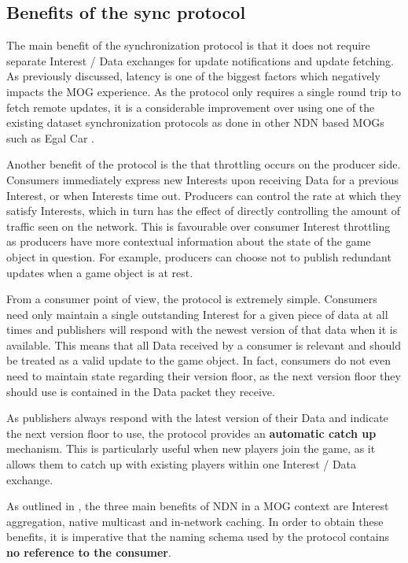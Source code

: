 \subsection{Benefits of the sync protocol}
The main benefit of the synchronization protocol is that it does not require separate Interest / Data exchanges for update notifications and update fetching. As previously discussed, latency is one of the biggest factors which negatively impacts the MOG experience. As the protocol only requires a single round trip to fetch remote updates, it is a considerable improvement over using one of the existing dataset synchronization protocols as done in other NDN based MOGs such as Egal Car \cite{egal-car}.

Another benefit of the protocol is the that throttling occurs on the producer side. Consumers immediately express new Interests upon receiving Data for a previous Interest, or when Interests time out. Producers can control the rate at which they satisfy Interests, which in turn has the effect of directly controlling the amount of traffic seen on the network. This is favourable over consumer Interest throttling as producers have more contextual information about the state of the game object in question. For example, producers can choose not to publish redundant updates when a game object is at rest.

From a consumer point of view, the protocol is extremely simple. Consumers need only maintain a single outstanding Interest for a given piece of data at all times and publishers will respond with the newest version of that data when it is available. This means that all Data received by a consumer is relevant and should be treated as a valid update to the game object. In fact, consumers do not even need to maintain state regarding their version floor, as the next version floor they should use is contained in the Data packet they receive.

As publishers always respond with the latest version of their Data and indicate the next version floor to use, the protocol provides an \textbf{automatic catch up} mechanism. This is particularly useful when new players join the game, as it allows them to catch up with existing players within one Interest / Data exchange.

As outlined in , the three main benefits of NDN in a MOG context are Interest aggregation, native multicast and in-network caching. In order to obtain these benefits, it is imperative that the naming schema used by the protocol contains \textbf{no reference to the consumer}.

